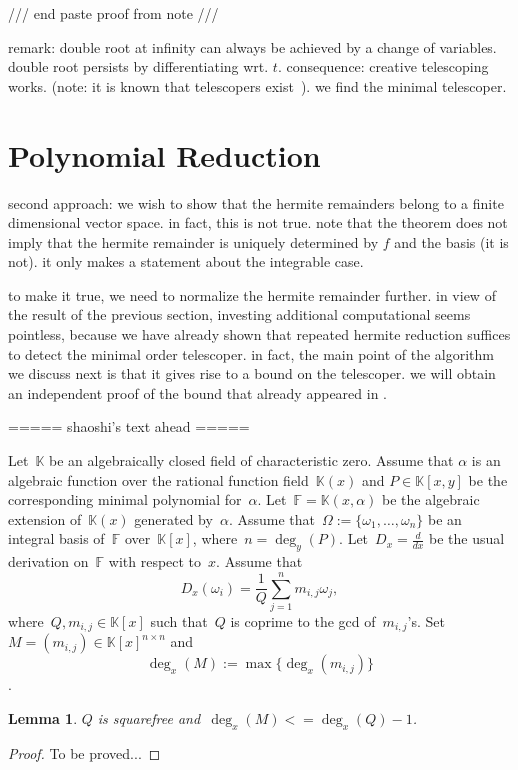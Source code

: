 \documentclass{sig-alternate}
\newtheorem{lemma}[theorem]{Lemma}
\newcommand{\red}{\color{red}}
\newcommand{\bF}{ {\mathbb F}}
\newcommand{\bK}{ {\mathbb K}}
\begin{document}
/// end paste proof from note /// 

remark: double root at infinity can always be achieved by a change of variables.
double root persists by differentiating wrt. $t$. consequence: creative telescoping works.
(note: it is known that telescopers exist~\cite{..,..,..}). 
we find the minimal telescoper.

\section{Polynomial Reduction}

second approach: we wish to show that the hermite remainders belong to a finite dimensional
vector space. in fact, this is not true. 
note that the theorem does not imply that the hermite remainder is uniquely determined by
$f$ and the basis (it is not). it only makes a statement about the integrable case. 

to make it true, we need to normalize the hermite remainder further. in view of the result
of the previous section, investing additional computational seems pointless, because we have
already shown that repeated hermite reduction suffices to detect the minimal order telescoper.
in fact, the main point of the algorithm we discuss next is that it gives rise to a bound on
the telescoper. we will obtain an independent proof of the bound that already appeared in \cite{GAZ}. 

===== shaoshi's text ahead =====

Let~$\bK$ be an algebraically closed field of characteristic zero.
Assume that $\alpha$ is an algebraic function over the rational function
field~$\bK(x)$ and $P\in \bK[x, y]$ be the corresponding minimal polynomial for~$\alpha$.
Let~$\bF = \bK(x, \alpha)$ be the algebraic extension of~$\bK(x)$ generated by~$\alpha$.
Assume that~$\Omega:=\{\omega_1, \ldots, \omega_n\}$ be an integral basis of~$\bF$
over~$\bK[x]$, where~$n=\deg_y(P)$. Let~$D_x=\frac{d}{dx}$ be the usual derivation on~$\bF$
with respect to~$x$. Assume that
\[D_x(\omega_i) = \frac{1}{Q}\sum_{j=1}^n m_{i, j}\omega_j,\]
where~$Q, m_{i, j}\in \bK[x]$ such that~$Q$ is coprime to the gcd of~$m_{i,j}$'s. Set~$M=(m_{i, j})\in \bK[x]^{n\times n}$
and
\[\deg_x(M):= \max\{\deg_x(m_{i, j})\}\].
\begin{lemma}\label{LEM:M}
$Q$ is squarefree and~$\deg_x(M) <= \deg_x(Q)-1$.
\end{lemma}
\begin{proof}{\red To be proved...}
\end{proof}
\end{document}

